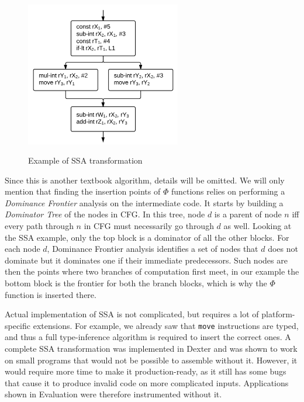 \documentclass[12pt,twoside,notitlepage]{report}
\begin{document}
\begin{figure}[t]
{  	\includegraphics[width=16pc]{figs/fig_implementation_ssa3.png}
  }
  \label{figure:Implementation_SSA3}

  \caption{Example of SSA transformation}
  \label{figure:Implementation_SSA}
\end{figure}

Since this is another textbook algorithm, details will be omitted. We will only mention that finding the insertion points of $\Phi$ functions relies on performing a \emph{Dominance Frontier} analysis on the intermediate code. It starts by building a \emph{Dominator Tree} of the nodes in CFG. In this tree, node $d$ is a parent of node $n$ iff every path through $n$ in CFG must necessarily go through $d$ as well. Looking at the SSA example, only the top block is a dominator of all the other blocks. For each node $d$, Dominance Frontier analysis identifies a set of nodes that $d$ does not dominate but it dominates one if their immediate predecessors. Such nodes are then the points where two branches of computation first meet, in our example the bottom block is the frontier for both the branch blocks, which is why the $\Phi$ function is inserted there.

Actual implementation of SSA is not complicated, but requires a lot of platform-specific extensions. For example, we already saw that \texttt{move} instructions are typed, and thus a full type-inference algorithm is required to insert the correct ones. A complete SSA transformation was implemented in Dexter and was shown to work on small programs that would not be possible to assemble without it. However, it would require more time to make it production-ready, as it still has some bugs that cause it to produce invalid code on more complicated inputs. Applications shown in Evaluation were therefore instrumented without it. 
\end{document}
